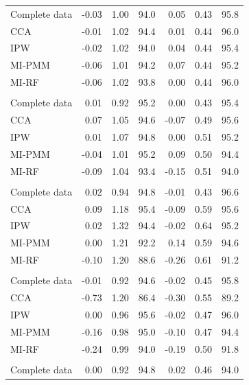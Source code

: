 \documentclass[11pt,a4paper]{article}
\begin{document}
\begin{longtable}{l|rrrrrr}
\midrule\addlinespace[2.5pt]
Complete data & -0.03 & 1.00 & 94.0 & 0.05 & 0.43 & 95.8 \\ 
CCA & -0.01 & 1.02 & 94.4 & 0.01 & 0.44 & 96.0 \\ 
IPW & -0.02 & 1.02 & 94.0 & 0.04 & 0.44 & 95.4 \\ 
MI-PMM & -0.06 & 1.01 & 94.2 & 0.07 & 0.44 & 95.2 \\ 
MI-RF & -0.06 & 1.02 & 93.8 & 0.00 & 0.44 & 96.0 \\ 
\midrule\addlinespace[2.5pt]
\multicolumn{7}{l}{MAR, 30\% missing} \\[2.5pt] 
\midrule\addlinespace[2.5pt]
Complete data & 0.01 & 0.92 & 95.2 & 0.00 & 0.43 & 95.4 \\ 
CCA & 0.07 & 1.05 & 94.6 & -0.07 & 0.49 & 95.6 \\ 
IPW & 0.01 & 1.07 & 94.8 & 0.00 & 0.51 & 95.2 \\ 
MI-PMM & -0.04 & 1.01 & 95.2 & 0.09 & 0.50 & 94.4 \\ 
MI-RF & -0.09 & 1.04 & 93.4 & -0.15 & 0.51 & 94.0 \\ 
\midrule\addlinespace[2.5pt]
\multicolumn{7}{l}{MAR, 50\% missing} \\[2.5pt] 
\midrule\addlinespace[2.5pt]
Complete data & 0.02 & 0.94 & 94.8 & -0.01 & 0.43 & 96.6 \\ 
CCA & 0.09 & 1.18 & 95.4 & -0.09 & 0.59 & 95.6 \\ 
IPW & 0.02 & 1.32 & 94.4 & -0.02 & 0.64 & 95.2 \\ 
MI-PMM & 0.00 & 1.21 & 92.2 & 0.14 & 0.59 & 94.6 \\ 
MI-RF & -0.10 & 1.20 & 88.6 & -0.26 & 0.61 & 91.2 \\ 
\midrule\addlinespace[2.5pt]
\multicolumn{7}{l}{MAR-strong, 10\% missing} \\[2.5pt] 
\midrule\addlinespace[2.5pt]
Complete data & -0.01 & 0.92 & 94.6 & -0.02 & 0.45 & 95.8 \\ 
CCA & -0.73 & 1.20 & 86.4 & -0.30 & 0.55 & 89.2 \\ 
IPW & 0.00 & 0.96 & 95.6 & -0.02 & 0.47 & 96.0 \\ 
MI-PMM & -0.16 & 0.98 & 95.0 & -0.10 & 0.47 & 94.4 \\ 
MI-RF & -0.24 & 0.99 & 94.0 & -0.19 & 0.50 & 91.8 \\ 
\midrule\addlinespace[2.5pt]
\multicolumn{7}{l}{MAR-strong, 30\% missing} \\[2.5pt] 
\midrule\addlinespace[2.5pt]
Complete data & 0.00 & 0.92 & 94.8 & 0.02 & 0.46 & 94.0 \\ 

\end{longtable}
\end{document}
